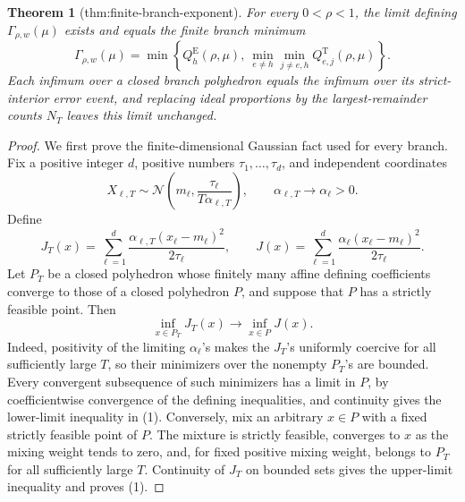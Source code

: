 \documentclass{article}
\newtheorem{theorem}{Theorem}
\begin{document}
\begin{theorem}[thm:finite-branch-exponent]\label{thm:finite-branch-exponent}
For every \(0<\rho<1\), the limit defining \(\Gamma_{\rho,w}(\mu)\) exists and equals the finite branch minimum \[\Gamma_{\rho,w}(\mu)=\min\left\{Q_h^{\mathrm E}(\rho,\mu),\ \min_{e\ne h}\min_{j\ne e,h}Q_{e,j}^{\mathrm T}(\rho,\mu)\right\}.\] Each infimum over a closed branch polyhedron equals the infimum over its strict-interior error event, and replacing ideal proportions by the largest-remainder counts \(N_T\) leaves this limit unchanged.
\end{theorem}
\begin{proof}
We first prove the finite-dimensional Gaussian fact used for every branch. Fix a positive integer \(d\), positive numbers \(\tau_1,\ldots,\tau_d\), and independent coordinates
\[
 X_{\ell,T}\sim\mathcal N\!\left(m_\ell,\frac{\tau_\ell}{T\alpha_{\ell,T}}\right),
 \qquad \alpha_{\ell,T}\longrightarrow\alpha_\ell>0.
\]
Define
\[
 J_T(x)=\sum_{\ell=1}^d\frac{\alpha_{\ell,T}(x_\ell-m_\ell)^2}{2\tau_\ell},
 \qquad
 J(x)=\sum_{\ell=1}^d\frac{\alpha_\ell(x_\ell-m_\ell)^2}{2\tau_\ell}.
\]
Let \(P_T\) be a closed polyhedron whose finitely many affine defining coefficients converge to those of a closed polyhedron \(P\), and suppose that \(P\) has a strictly feasible point. Then
\[
 \inf_{x\in P_T}J_T(x)\longrightarrow\inf_{x\in P}J(x). \tag{1}
\]
Indeed, positivity of the limiting \(\alpha_\ell\)'s makes the \(J_T\)'s uniformly coercive for all sufficiently large \(T\), so their minimizers over the nonempty \(P_T\)'s are bounded. Every convergent subsequence of such minimizers has a limit in \(P\), by coefficientwise convergence of the defining inequalities, and continuity gives the lower-limit inequality in (1). Conversely, mix an arbitrary \(x\in P\) with a fixed strictly feasible point of \(P\). The mixture is strictly feasible, converges to \(x\) as the mixing weight tends to zero, and, for fixed positive mixing weight, belongs to \(P_T\) for all sufficiently large \(T\). Continuity of \(J_T\) on bounded sets gives the upper-limit inequality and proves (1).


\end{proof}
\end{document}
